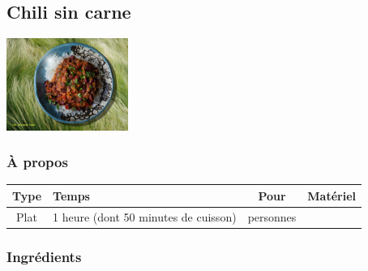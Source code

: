 \subsection{Chili sin carne}



\begin{center}
	\includegraphics[clip,height=3cm,width=0.8\linewidth]{./img/chili-sin-carne.png}
\end{center}

\subsubsection*{À propos}

\begin{center}
	\begin{tabularx}{0.8\linewidth}{|c|X|c|c|} \hline
		Type & Temps & Pour & Matériel \\ \hline
		Plat & 1 heure (dont 50 minutes de cuisson) & \curef{chili-sin-carne} personnes & \Gasstove \\ \hline
	\end{tabularx}
\end{center}

\subsubsection*{Ingrédients}

